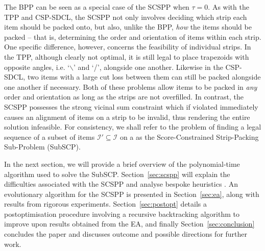 \documentclass{elsarticle}
\begin{document}
\noindent The BPP can be seen as a special case of the SCSPP when $\tau = 0$. As with the TPP and CSP-SDCL, the SCSPP not only involves deciding which strip each item should be packed onto, but also, unlike the BPP, \emph{how} the items should be packed -- that is, determining the order and orientation of items within each strip. One specific difference, however, concerns the feasibility of individual strips. In the TPP, although clearly not optimal, it is still legal to place trapezoids with opposite angles, i.e. `$\backslash$' and `/', alongside one another. Likewise in the CSP-SDCL, two items with a large cut loss between them can still be packed alongside one another if necessary. Both of these problems allow items to be packed in \emph{any} order and orientation as long as the strips are not overfilled. In contrast, the SCSPP possesses the strong vicinal sum constraint which if violated immediately causes an alignment of items on a strip to be invalid, thus rendering the entire solution infeasible. For consistency, we shall refer to the  problem of finding a legal sequence of a subset of items $\mathcal{I}' \subseteq \mathcal{I}$ on a  as the Score-Constrained Strip-Packing Sub-Problem (SubSCP).

In the next section, we will provide a brief overview of the polynomial-time algorithm used to solve the SubSCP. Section~\ref{sec:scspp} will explain the difficulties associated with the SCSPP and analyse bespoke heuristics . An evolutionary algorithm for the SCSPP is presented in Section~\ref{sec:ea}, along with results from rigorous experiments. Section~\ref{sec:postopt} details a postoptimisation procedure involving a recursive backtracking algorithm to improve upon results obtained from the EA, and finally Section~\ref{sec:conclusion} concludes the paper and discusses outcome and possible directions for further work.
\end{document}
